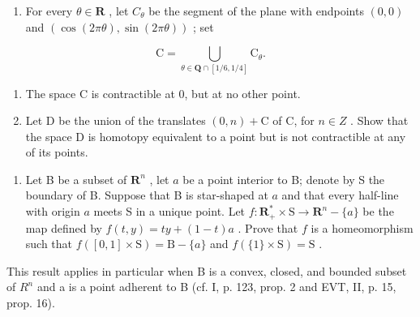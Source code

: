 \exercisegroup

\begin{enumerate}
\def\labelenumi{\arabic{enumi})}
\tightlist
\item
  For every \(\theta \in \mathbf{R}\) , let \(C_{\theta}\) be the segment of the plane with endpoints \((0,0)\) and \((\cos(2\pi\theta), \sin(2\pi\theta))\) ; set
\end{enumerate}

\[
\mathrm{C} = \bigcup_ {\theta \in \mathbf {Q} \cap [ 1 / 6, 1 / 4 ]} \mathrm{C} _ {\theta}.
\]

\begin{enumerate}
\def\labelenumi{\alph{enumi})}
\item
  The space C is contractible at 0, but at no other point.
\item
  Let D be the union of the translates \((0, n) + \mathrm{C}\) of C, for \(n \in Z\) . Show that the space D is homotopy equivalent to a point but is not contractible at any of its points.
\end{enumerate}

\begin{enumerate}
\def\labelenumi{\arabic{enumi})}
\setcounter{enumi}{1}
\tightlist
\item
  Let B be a subset of \(\mathbf{R}^{n}\) , let \(a\) be a point interior to B; denote by S the boundary of B. Suppose that B is star-shaped at \(a\) and that every half-line with origin \(a\) meets S in a unique point. Let \(f\colon\mathbf{R}_{+}^{*}\times\mathrm{S}\to\mathbf{R}^{n}-\{a\}\) be the map defined by \(f(t,y)=ty+(1-t)a\) . Prove that \(f\) is a homeomorphism such that \(f([0,1]\times\mathrm{S})=\mathrm{B}-\{a\}\) and \(f(\{1\}\times\mathrm{S})=\mathrm{S}\) .
\end{enumerate}

This result applies in particular when B is a convex, closed, and bounded subset of \(R^{n}\) and a is a point adherent to B (cf. I, p. 123, prop. 2 and EVT, II, p. 15, prop. 16).

